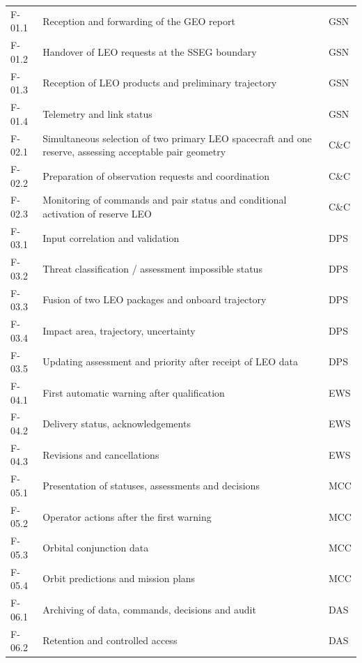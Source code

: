 \begingroup{}
\begin{longtable}{|P{0.20}|P{0.65}|P{0.15}|}
\hline{}
 &  & \\ \hline
\endhead
\hline\endlastfoot
F-01.1 & Reception and forwarding of the GEO report & GSN\\ \hline
F-01.2 & Handover of LEO requests at the SSEG boundary & GSN\\ \hline
F-01.3 & Reception of LEO products and preliminary trajectory & GSN\\ \hline
F-01.4 & Telemetry and link status & GSN\\ \hline
F-02.1 & Simultaneous selection of two primary LEO spacecraft and one reserve, assessing acceptable pair geometry & C\&C\\ \hline
F-02.2 & Preparation of observation requests and coordination & C\&C\\ \hline
F-02.3 & Monitoring of commands and pair status and conditional activation of reserve LEO & C\&C\\ \hline
F-03.1 & Input correlation and validation & DPS\\ \hline
F-03.2 & Threat classification /\allowbreak{} assessment impossible status & DPS\\ \hline
F-03.3 & Fusion of two LEO packages and onboard trajectory & DPS\\ \hline
F-03.4 & Impact area, trajectory, uncertainty & DPS\\ \hline
F-03.5 & Updating assessment and priority after receipt of LEO data & DPS\\ \hline
F-04.1 & First automatic warning after qualification & EWS\\ \hline
F-04.2 & Delivery status, acknowledgements & EWS\\ \hline
F-04.3 & Revisions and cancellations & EWS\\ \hline
F-05.1 & Presentation of statuses, assessments and decisions & MCC\\ \hline
F-05.2 & Operator actions after the first warning & MCC\\ \hline
F-05.3 & Orbital conjunction data & MCC\\ \hline
F-05.4 & Orbit predictions and mission plans & MCC\\ \hline
F-06.1 & Archiving of data, commands, decisions and audit & DAS\\ \hline
F-06.2 & Retention and controlled access & DAS\\ \hline

\end{longtable}

